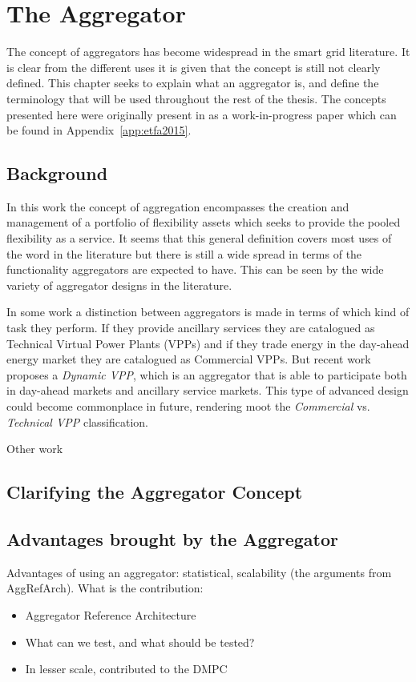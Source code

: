 \chapter{The Aggregator} %
\label{cha:aggregator}
The concept of aggregators has become widespread in the smart grid literature. It is clear from the different uses it is given that the concept is still not clearly defined. This chapter seeks to explain what an aggregator is, and define the terminology that will be used throughout the rest of the thesis. The concepts presented here were originally present in as a work-in-progress paper which can be found in Appendix~\ref{app:etfa2015}. 

\section{Background}
In this work the concept of aggregation encompasses the creation and management of a portfolio of flexibility assets which seeks to provide the pooled flexibility as a service. It seems that this general definition covers most uses of the word in the literature but there is still a wide spread in terms of the functionality aggregators are expected to have. This can be seen by the wide variety of aggregator designs in the literature.

In some work a distinction between aggregators is made in terms of which kind of task they perform. If they provide ancillary services they are catalogued as Technical Virtual Power Plants (VPPs) and if they trade energy in the day-ahead energy market they are catalogued as Commercial VPPs. But recent work proposes a \emph{Dynamic VPP}, which is an aggregator that is able to participate both in day-ahead markets and ancillary service markets. This type of advanced design could become commonplace in future, rendering moot the \emph{Commercial} vs. \emph{Technical VPP} classification. 

Other work 


\section{Clarifying the Aggregator Concept}

\section{Advantages brought by the Aggregator}
Advantages of using an aggregator: statistical, scalability (the arguments from AggRefArch). What is the contribution:
\begin{itemize}
	\item Aggregator Reference Architecture
	\item What can we test, and what should be tested?
	\item In lesser scale, contributed to the DMPC
\end{itemize}

